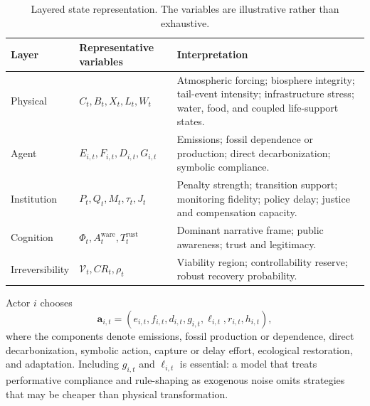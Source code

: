 \documentclass[11pt,a4paper]{article}
\numberwithin{equation}{section}
\theoremstyle{definition}
\theoremstyle{plain}
\theoremstyle{remark}
\newcommand{\action}{\bm{a}}
\begin{document}
\begin{table}[H]
\centering
\caption{Layered state representation. The variables are illustrative rather than exhaustive.}
\label{tab:layers}
\begin{tabularx}{\textwidth}{@{}L{0.18\textwidth}L{0.26\textwidth}Y@{}}
\toprule
\textbf{Layer} & \textbf{Representative variables} & \textbf{Interpretation} \\
\midrule
Physical & $C_t,B_t,X_t,L_t,W_t$ & Atmospheric forcing; biosphere integrity; tail-event intensity; infrastructure stress; water, food, and coupled life-support states. \\
Agent & $E_{i,t},F_{i,t},D_{i,t},G_{i,t}$ & Emissions; fossil dependence or production; direct decarbonization; symbolic compliance. \\
Institution & $P_t,Q_t,M_t,\tau_t,J_t$ & Penalty strength; transition support; monitoring fidelity; policy delay; justice and compensation capacity. \\
Cognition & $\Phi_t,A_t^{\mathrm{ware}},T_t^{\mathrm{rust}}$ & Dominant narrative frame; public awareness; trust and legitimacy. \\
Irreversibility & $\mathcal V_t,CR_t,\rho_t$ & Viability region; controllability reserve; robust recovery probability. \\
\bottomrule
\end{tabularx}
\end{table}

Actor $i$ chooses
\begin{equation}
  \action_{i,t}=(e_{i,t},f_{i,t},d_{i,t},g_{i,t},\ell_{i,t},r_{i,t},h_{i,t}),
  \label{eq:action}
\end{equation}
where the components denote emissions, fossil production or dependence, direct decarbonization, symbolic action, capture or delay effort, ecological restoration, and adaptation. Including $g_{i,t}$ and $\ell_{i,t}$ is essential: a model that treats performative compliance and rule-shaping as exogenous noise omits strategies that may be cheaper than physical transformation.
\end{document}
